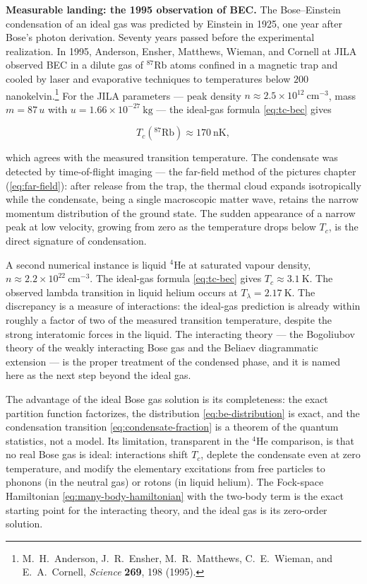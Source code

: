 \medskip\noindent\textbf{Measurable landing: the 1995 observation of BEC.}
The Bose--Einstein condensation of an ideal gas was predicted by Einstein in 1925, one year after Bose's photon derivation. Seventy years passed before the experimental realization. In 1995, Anderson, Ensher, Matthews, Wieman, and Cornell at JILA observed BEC in a dilute gas of $^{87}$Rb atoms confined in a magnetic trap and cooled by laser and evaporative techniques to temperatures below $200$ nanokelvin.\footnote{M.~H.~Anderson, J.~R.~Ensher, M.~R.~Matthews, C.~E.~Wieman, and E.~A.~Cornell, \emph{Science} \textbf{269}, 198 (1995).} For the JILA parameters --- peak density $n \approx 2.5 \times 10^{12}\ \text{cm}^{-3}$, mass $m = 87\,u$ with $u = 1.66 \times 10^{-27}\ \text{kg}$ --- the ideal-gas formula \eqref{eq:tc-bec} gives
\begin{linenomath}
    \begin{equation}
        T_c(^{87}\text{Rb}) \approx 170\ \text{nK},
        \label{eq:tc-rubidium}
    \end{equation}
\end{linenomath}
which agrees with the measured transition temperature. The condensate was detected by time-of-flight imaging --- the far-field method of the pictures chapter (\eqref{eq:far-field}): after release from the trap, the thermal cloud expands isotropically while the condensate, being a single macroscopic matter wave, retains the narrow momentum distribution of the ground state. The sudden appearance of a narrow peak at low velocity, growing from zero as the temperature drops below $T_c$, is the direct signature of condensation.

A second numerical instance is liquid $^4$He at saturated vapour density, $n \approx 2.2 \times 10^{22}\ \text{cm}^{-3}$. The ideal-gas formula \eqref{eq:tc-bec} gives $T_c \approx 3.1\ \text{K}$. The observed lambda transition in liquid helium occurs at $T_\lambda = 2.17\ \text{K}$. The discrepancy is a measure of interactions: the ideal-gas prediction is already within roughly a factor of two of the measured transition temperature, despite the strong interatomic forces in the liquid. The interacting theory --- the Bogoliubov theory of the weakly interacting Bose gas and the Beliaev diagrammatic extension --- is the proper treatment of the condensed phase, and it is named here as the next step beyond the ideal gas.

The advantage of the ideal Bose gas solution is its completeness: the exact partition function factorizes, the distribution \eqref{eq:be-distribution} is exact, and the condensation transition \eqref{eq:condensate-fraction} is a theorem of the quantum statistics, not a model. Its limitation, transparent in the $^4$He comparison, is that no real Bose gas is ideal: interactions shift $T_c$, deplete the condensate even at zero temperature, and modify the elementary excitations from free particles to phonons (in the neutral gas) or rotons (in liquid helium). The Fock-space Hamiltonian \eqref{eq:many-body-hamiltonian} with the two-body term is the exact starting point for the interacting theory, and the ideal gas is its zero-order solution.

